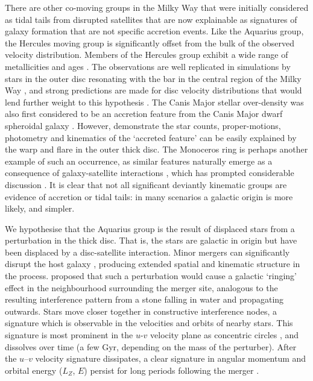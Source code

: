 \documentclass{emulateapj}
\begin{document}
 
There are other co-moving groups in the Milky Way that were initially considered as tidal tails from disrupted satellites that are now explainable as signatures of galaxy formation that are not specific accretion events. Like the Aquarius group, the Hercules moving group is significantly offset from the bulk of the observed velocity distribution. Members of the Hercules group exhibit a wide range of metallicities and ages \citep{bensby;et-al_2007, bovy;hogg_2010}. The observations are well replicated in simulations by stars in the outer disc resonating with the bar in the central region of the Milky Way \citep{dehnen_2000,fux_2001}, and strong predictions are made for disc velocity distributions that would lend further weight to this hypothesis \citep{bovy_2010}. The Canis Major stellar over-density was also first considered to be an accretion feature from the Canis Major dwarf spheroidal galaxy \citep{martin;et-al_2004}. However, \citet{momany;et-al_2004} demonstrate the star counts, proper-motions, photometry and kinematics of the `accreted feature' can be easily explained by the warp and flare in the outer thick disc. The Monoceros ring \citep{newberg;et-al_2002,juric;et-al_2008} is perhaps another example of such an occurrence, as similar features naturally emerge as a consequence of galaxy-satellite interactions \citep{purcell;et-al_2011}, which has prompted considerable discussion \citep{lopez-corredoira;et-al_2012}. It is clear that not all significant deviantly kinematic groups are evidence of accretion or tidal tails: in many scenarios a galactic origin is more likely, and simpler.


We hypothesise that the Aquarius group is the result of displaced stars from a perturbation in the thick disc. That is, the stars are galactic in origin but have been displaced by a disc-satellite interaction. Minor mergers can significantly disrupt the host galaxy \citep{villalobos;helmi_2008}, producing extended  spatial and kinematic structure in the process. \citet{minchev;et-al_2009} proposed that such a perturbation would cause a galactic `ringing' effect in the neighbourhood surrounding the merger site, analogous to the resulting interference pattern from a stone falling in water and propagating outwards. Stars move closer together in constructive interference nodes, a signature which is observable in the velocities and orbits of nearby stars. This signature is most prominent  in the $u$-$v$ velocity plane as concentric circles \citep{gomez;et-al_2012}, and dissolves over time (a few Gyr, depending on the mass of the perturber). After the $u$--$v$ velocity signature dissipates, a clear signature in angular momentum and orbital energy ($L_Z$, $E$) persist for long periods following the merger \citep[e.g. see][]{gomez;et-al_2012}.
\end{document}
